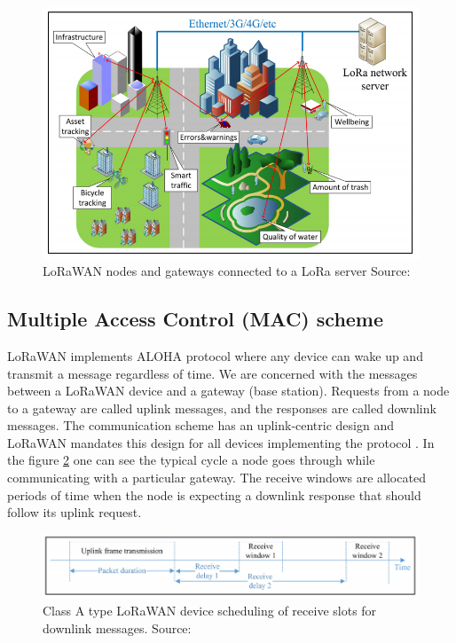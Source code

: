 \begin{figure}[h!]
  \centering
  \includegraphics[scale=0.4]{figures/start-topology.PNG}
  \caption{LoRaWAN nodes and gateways connected to a LoRa server Source: \cite{doppler}}
  \label{fig:star}
\end{figure}

\subsection{Multiple Access Control (MAC) scheme}

LoRaWAN implements ALOHA protocol where any device can wake up and transmit a message regardless of time. We are concerned with the messages between a LoRaWAN device and a gateway (base station). Requests from a node to a gateway are called uplink messages, and the responses are called downlink messages.  
The communication scheme has an uplink-centric design and 
LoRaWAN mandates this design for all devices implementing the protocol \cite{simulator}. In the figure \ref{fig:class A} one can see the typical cycle a node goes through while communicating with a particular gateway. The receive windows are allocated periods of time when the node is expecting 
a downlink response that should follow its uplink request.

\begin{figure}[h!]
  \centering
  \includegraphics[scale=0.5]{figures/class A.PNG}
  \caption{Class A type LoRaWAN device scheduling of receive slots for downlink messages. Source: \cite{doppler}}
  \label{fig:class A}
\end{figure}

